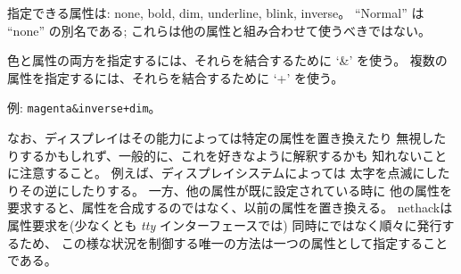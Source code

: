 指定できる属性は:
none, bold, dim, underline, blink, inverse。
``Normal'' は ``none'' の別名である;
これらは他の属性と組み合わせて使うべきではない。

色と属性の両方を指定するには、それらを結合するために `\&' を使う。
複数の属性を指定するには、それらを結合するために `+' を使う。

例: {\tt magenta\&inverse+dim}。

なお、ディスプレイはその能力によっては特定の属性を置き換えたり
無視したりするかもしれず、一般的に、これを好きなように解釈するかも
知れないことに注意すること。
例えば、ディスプレイシステムによっては
太字を点滅にしたりその逆にしたりする。
一方、他の属性が既に設定されている時に
他の属性を要求すると、属性を合成するのではなく、以前の属性を置き換える。
nethackは属性要求を(少なくとも {\it tty}  インターフェースでは)
同時にではなく順々に発行するため、
この様な状況を制御する唯一の方法は一つの属性として指定することである。

